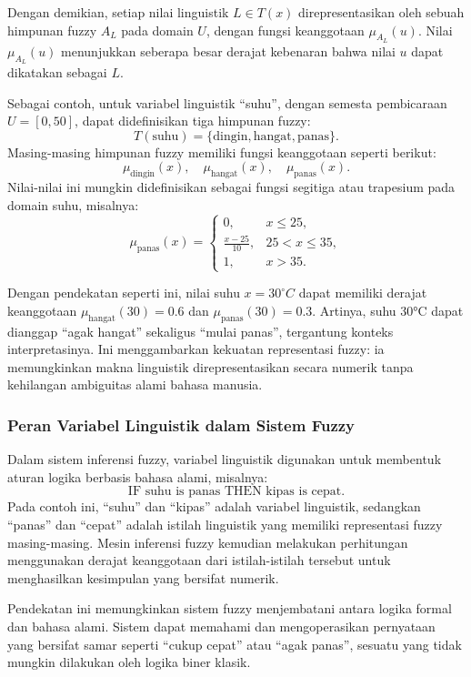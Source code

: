 \documentclass[12pt,a4paper]{article}
\theoremstyle{remark}
\begin{document}
Dengan demikian, setiap nilai linguistik \(L \in T(x)\) direpresentasikan oleh sebuah himpunan fuzzy \(A_L\) pada domain \(U\), dengan fungsi keanggotaan \(\mu_{A_L}(u)\). Nilai \(\mu_{A_L}(u)\) menunjukkan seberapa besar derajat kebenaran bahwa nilai \(u\) dapat dikatakan sebagai \(L\).

Sebagai contoh, untuk variabel linguistik “suhu”, dengan semesta pembicaraan \(U = [0, 50]\), dapat didefinisikan tiga himpunan fuzzy:
\[
    T(\text{suhu}) = \{\text{dingin}, \text{hangat}, \text{panas}\}.
\]
Masing-masing himpunan fuzzy memiliki fungsi keanggotaan seperti berikut:
\[
    \mu_{\text{dingin}}(x), \quad \mu_{\text{hangat}}(x), \quad \mu_{\text{panas}}(x).
\]
Nilai-nilai ini mungkin didefinisikan sebagai fungsi segitiga atau trapesium pada domain suhu, misalnya:
\[
    \mu_{\text{panas}}(x) =
    \begin{cases}
        0,                 & x \leq 25,      \\
        \frac{x - 25}{10}, & 25 < x \leq 35, \\
        1,                 & x > 35.
    \end{cases}
\]

Dengan pendekatan seperti ini, nilai suhu \(x = 30^\circ C\) dapat memiliki derajat keanggotaan \(\mu_{\text{hangat}}(30) = 0.6\) dan \(\mu_{\text{panas}}(30) = 0.3\). Artinya, suhu 30°C dapat dianggap “agak hangat” sekaligus “mulai panas”, tergantung konteks interpretasinya. Ini menggambarkan kekuatan representasi fuzzy: ia memungkinkan makna linguistik direpresentasikan secara numerik tanpa kehilangan ambiguitas alami bahasa manusia.

\subsubsection{Peran Variabel Linguistik dalam Sistem Fuzzy}
Dalam sistem inferensi fuzzy, variabel linguistik digunakan untuk membentuk aturan logika berbasis bahasa alami, misalnya:
\[
    \text{IF suhu is panas THEN kipas is cepat}.
\]
Pada contoh ini, “suhu” dan “kipas” adalah variabel linguistik, sedangkan “panas” dan “cepat” adalah istilah linguistik yang memiliki representasi fuzzy masing-masing. Mesin inferensi fuzzy kemudian melakukan perhitungan menggunakan derajat keanggotaan dari istilah-istilah tersebut untuk menghasilkan kesimpulan yang bersifat numerik.

Pendekatan ini memungkinkan sistem fuzzy menjembatani antara logika formal dan bahasa alami. Sistem dapat memahami dan mengoperasikan pernyataan yang bersifat samar seperti “cukup cepat” atau “agak panas”, sesuatu yang tidak mungkin dilakukan oleh logika biner klasik.
\end{document}
